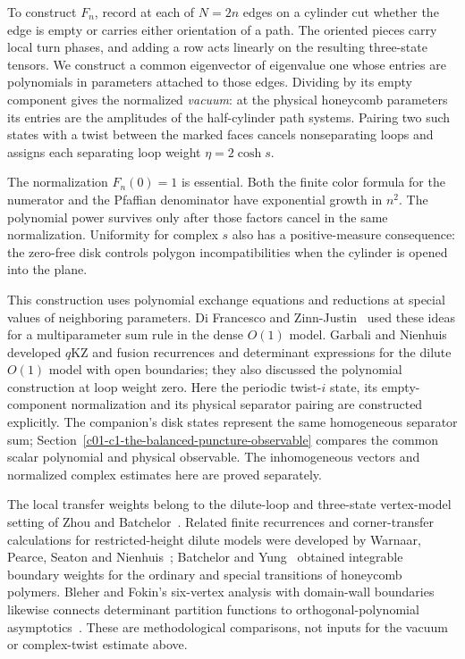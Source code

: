 To construct $F_n$, record at each of $N=2n$ edges on a cylinder cut
whether the edge is empty or carries either orientation of a path.
The oriented pieces carry local turn phases, and adding a row acts
linearly on the resulting three-state tensors. We construct a common
eigenvector of eigenvalue one whose entries are polynomials in
parameters attached to those edges. Dividing by its empty component
gives the normalized \emph{vacuum}: at the physical honeycomb parameters
its entries are the amplitudes of the half-cylinder path systems.
Pairing two such states with a twist between the marked faces cancels
nonseparating loops and assigns each separating loop weight
$\eta=2\cosh s$.

The normalization $F_n(0)=1$ is essential. Both the finite color formula
for the numerator and the Pfaffian denominator have exponential growth
in $n^2$. The polynomial power survives only after those factors cancel
in the same normalization. Uniformity for complex $s$ also has a
positive-measure consequence: the zero-free disk controls polygon
incompatibilities when the cylinder is opened into the plane.

This construction uses polynomial exchange equations and reductions at
special values of neighboring parameters. Di Francesco and
Zinn-Justin~\cite{DiFrancescoZinnJustin2005} used these ideas for a
multiparameter sum rule in the dense $O(1)$ model. Garbali and
Nienhuis~\cite{GarbaliNienhuis2017Ground,GarbaliNienhuis2017Sum}
developed $q$KZ and fusion recurrences and determinant expressions for
the dilute $O(1)$ model with open boundaries; they also discussed the
polynomial construction at loop weight zero. Here the periodic
twist-$i$ state, its empty-component normalization and its physical
separator pairing are constructed explicitly. The companion's disk
states represent the same homogeneous separator sum;
Section~\ref{c01-c1-the-balanced-puncture-observable} compares the common
scalar polynomial and physical observable. The inhomogeneous vectors
and normalized complex estimates here are proved separately.

The local transfer weights belong to the dilute-loop and three-state
vertex-model setting of Zhou and Batchelor~\cite{ZhouBatchelor1997}.
Related finite recurrences and corner-transfer calculations for
restricted-height dilute models were developed by Warnaar, Pearce,
Seaton and Nienhuis~\cite{WarnaarPearceSeatonNienhuis1994}; Batchelor
and Yung~\cite{BatchelorYung1995} obtained integrable boundary weights
for the ordinary and special transitions of honeycomb polymers.
Bleher and Fokin's six-vertex analysis with domain-wall boundaries
likewise connects determinant partition functions to
orthogonal-polynomial asymptotics~\cite{BleherFokin2006}. These are
methodological comparisons, not inputs for the vacuum or complex-twist
estimate above.

